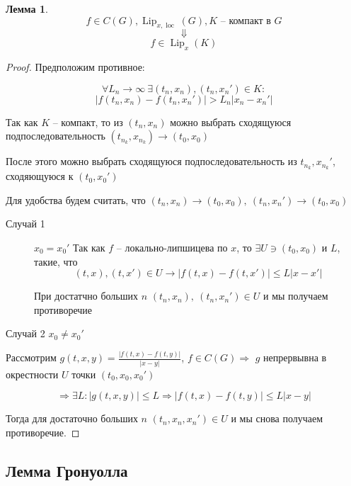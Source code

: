 \documentclass[a4paper]{article}
\theoremstyle{indented}
\newtheorem*{lemma}{Лемма}
\theoremstyle{definition}
\theoremstyle{remark}
\DeclareMathOperator{\Lip}{Lip}
\DeclareMathOperator{\loc}{loc}
\begin{document}
\begin{lemma}
  \[f \in C(G), \Lip_{x,\loc}(G), K \text{ -- компакт в } G\]
  \[\Downarrow \]
  \[f \in \Lip_x(K)\]
\end{lemma}
\begin{proof}
  Предположим противное:

  \[\forall L_n \to \infty \ \exists (t_n,x_n), (t_n, x_n') \in K:\]
  \[|f(t_n,x_n) - f(t_n,x_n') | > L_n |x_n - x_n'|\]

  Так как $K$ -- компакт, то из $(t_n,x_n)$ можно выбрать сходящуюся подпоследовательность $(t_{n_k},x_{n_k}) \to (t_0, x_0)$

  После этого можно выбрать сходящуюся подпоследовательность из $t_{n_k}, x_{n_k}'$, сходяющуюся к $(t_0,x_0')$

  Для удобства будем считать, что $(t_n,x_n) \to (t_0,x_0), \ (t_n,x_n') \to (t_0,x_0)$
  \begin{description}
  \item[Случай 1] $x_0 = x_0'$
    Так как $f$ -- локально-липшицева по $x$, то $\exists U \ni (t_0,x_0)$ и $L$, такие, что
    \[(t,x), (t,x') \in U  \to |f(t,x) - f(t,x')| \leqslant L|x - x'|\]

    При достатчно больших $n$ $(t_n,x_n), \ (t_n,x_n') \in U$ и мы получаем противоречие
  \end{description}
\item[Случай 2] $x_0 \neq x_0'$

  Рассмотрим $g(t,x,y) = \frac{|f(t,x) - f(t,y)|}{|x-y|} $, $f \in C(G) \Rightarrow $ $g$ непрервывна в окрестности $U$ точки $(t_0,x_0,x_0')$

  \[\Rightarrow \exists L : |g(t,x,y)| \leqslant L \Rightarrow |f(t,x) - f(t,y)| \leqslant L|x-y|\]
  
  Тогда для достаточно больших $n$ $(t_n,x_n,x_n') \in U$ и мы снова получаем противоречие.
  
\end{proof}

\subsection{Лемма Гронуолла}
\end{document}
